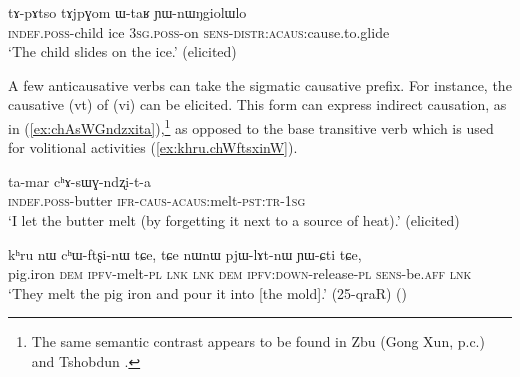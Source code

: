 \begin{exe}
\ex \label{ex:YWnWNgiolWlo}
\gll tɤ-pɤtso tɤjpɣom ɯ-taʁ ɲɯ-nɯŋgiolɯlo \\
\textsc{indef}.\textsc{poss}-child ice \textsc{3sg}.\textsc{poss}-on \textsc{sens}-\textsc{distr}:\textsc{acaus}:cause.to.glide \\
\glt `The child slides on the ice.' (elicited)
\end{exe}

A few anticausative verbs can take the sigmatic causative prefix. For instance, the causative  (vt) of  (vi) can be elicited. This form can express indirect causation, as in (\ref{ex:chAsWGndzxita}),\footnote{The same semantic contrast appears to be found in Zbu (Gong Xun, p.c.) and Tshobdun \citep{jackson14morpho}. } as opposed to the base transitive verb  which is used for volitional activities (\ref{ex:khru.chWftsxinW}).

\begin{exe}
\ex \label{ex:chAsWGndzxita}
\gll ta-mar cʰɤ-sɯɣ-ndʐi-t-a \\
\textsc{indef}.\textsc{poss}-butter \textsc{ifr}-\textsc{caus}-\textsc{acaus}:melt-\textsc{pst}:\textsc{tr}-\textsc{1sg} \\
\glt `I let the butter melt (by forgetting it next to a source of heat).' (elicited)
\end{exe}

\begin{exe}
\ex \label{ex:khru.chWftsxinW}
\gll kʰru nɯ cʰɯ-ftʂi-nɯ tɕe, tɕe nɯnɯ pjɯ-lɤt-nɯ ɲɯ-ɕti tɕe, \\
pig.iron \textsc{dem} \textsc{ipfv}-melt-\textsc{pl} \textsc{lnk} \textsc{lnk} \textsc{dem} \textsc{ipfv}:\textsc{down}-release-\textsc{pl} \textsc{sens}-be.\textsc{aff} \textsc{lnk} \\
\glt `They melt the pig iron and pour it into [the mold].' (25-qraR)
()
\end{exe}

